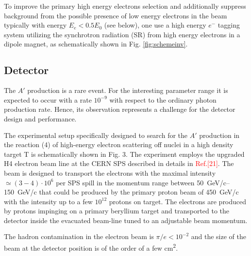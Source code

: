 To improve the primary high energy electrons selection and additionally suppress background from the possible presence
of low energy electrons in the beam typically with energy $E_e <0.5 E_0$ (see below), one use a high energy $e^-$ tagging
system utilizing the synchrotron radiation (SR) from high energy electrons in a dipole magnet, as schematically shown in
Fig. \ref{fig:schemeinv}. 




\subsection{Detector}
The $A'$ production is a rare event. For the interesting parameter range it is expected to occur with a rate $10^{-9}$ with
respect to the ordinary photon production rate. Hence, its observation represents a challenge for the detector design
and performance.\par
The experimental setup specifically designed to search for the $A'$ production in the reaction (4) of high-energy
electron scattering off nuclei in a high density target T is schematically shown in Fig. 3. The experiment employs the
upgraded H4 electron beam line at the CERN SPS described in details in \textcolor{red}{Ref.[21]}. The beam is designed to transport the
electrons with the maximal intensity $\simeq (3 - 4) \cdot 10^6$ per SPS spill in the momentum range between
\SIrange{50}{150}{GeV/c} that
could be produced by the primary proton beam of \SI{450}{GeV/c} with the intensity up to a few $10^12$ protons on target. The
electrons are produced by protons impinging on a primary beryllium target and transported to the detector inside the
evacuated beam-line tuned to an adjustable beam momentum. \par
The hadron contamination in the electron beam is $\pi/e < 10^{-2}$ and the size of the beam at the detector position is
of the order of a few \si{\square\centi\metre}.

